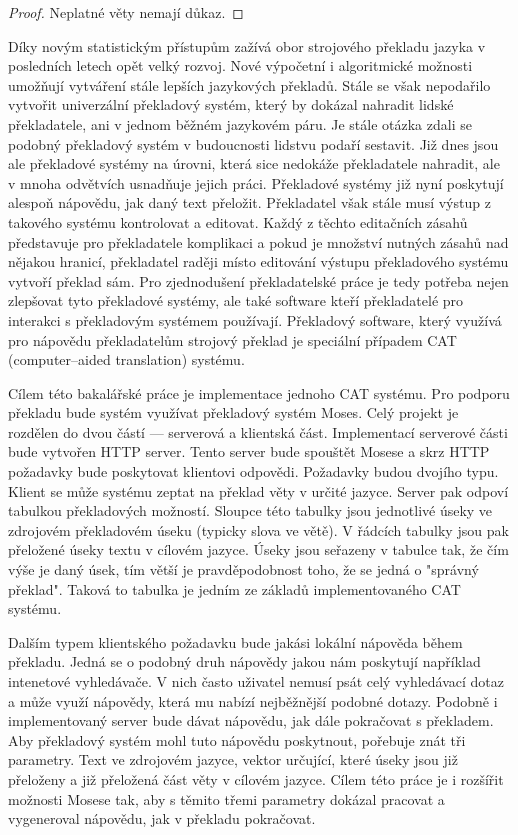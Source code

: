 \documentclass[12pt,a4paper]{report}
\begin{document}
\begin{proof}
Neplatné věty nemají důkaz.
\end{proof}

Díky novým statistickým přístupům zažívá obor strojového překladu jazyka v posledních letech opět velký rozvoj. Nové výpočetní i algoritmické možnosti umožňují vytváření stále lepších jazykových překladů. Stále se však nepodařilo vytvořit univerzální překladový systém, který by dokázal nahradit lidské překladatele, ani v jednom běžném jazykovém páru. Je stále otázka zdali se podobný překladový systém v budoucnosti lidstvu podaří sestavit. Již dnes jsou ale překladové systémy na úrovni, která sice nedokáže překladatele nahradit, ale v mnoha odvětvích usnadňuje jejich práci. Překladové systémy již nyní poskytují alespoň nápovědu, jak daný text přeložit. Překladatel však stále musí výstup z takového systému kontrolovat a editovat. Každý z těchto editačních zásahů představuje pro překladatele komplikaci a pokud je množství nutných zásahů nad nějakou hranicí, překladatel raději místo editování výstupu překladového systému vytvoří překlad sám. Pro zjednodušení překladatelské práce je tedy potřeba nejen zlepšovat tyto překladové systémy, ale také software kteří překladatelé pro interakci s překladovým systémem používají. Překladový software, který využívá pro nápovědu překladatelům strojový překlad je speciální případem CAT (computer--aided translation) systému.

Cílem této bakalářské práce je implementace jednoho CAT systému. Pro podporu překladu bude systém využívat překladový systém Moses. Celý projekt je rozdělen do dvou částí --- serverová a klientská část. Implementací serverové části bude vytvořen HTTP server. Tento server bude spouštět Mosese a skrz HTTP požadavky bude poskytovat klientovi odpovědi. Požadavky budou dvojího typu. Klient se může systému zeptat na překlad věty v určité jazyce. Server pak odpoví tabulkou překladových možností. Sloupce této tabulky jsou jednotlivé úseky ve zdrojovém překladovém úseku (typicky slova ve větě). V řádcích tabulky jsou pak přeložené úseky textu v cílovém jazyce. Úseky jsou seřazeny v tabulce tak, že čím výše je daný úsek, tím větší je pravděpodobnost toho, že se jedná o "správný překlad". Taková to tabulka je jedním ze základů implementovaného CAT systému.

Dalším typem klientského požadavku bude jakási lokální nápověda během překladu. Jedná se o podobný druh nápovědy jakou nám poskytují například intenetové vyhledávače. V nich často uživatel nemusí psát celý vyhledávací dotaz a může využí nápovědy, která mu nabízí nejběžnější podobné dotazy. Podobně i implementovaný server bude dávat nápovědu, jak dále pokračovat s překladem. Aby překladový systém mohl tuto nápovědu poskytnout, pořebuje znát tři parametry. Text ve zdrojovém jazyce, vektor určující, které úseky jsou již přeloženy a již přeložená část věty v cílovém jazyce. Cílem této práce je i rozšířit možnosti Mosese tak, aby s těmito třemi parametry dokázal pracovat a vygeneroval nápovědu, jak v překladu pokračovat.
\end{document}
